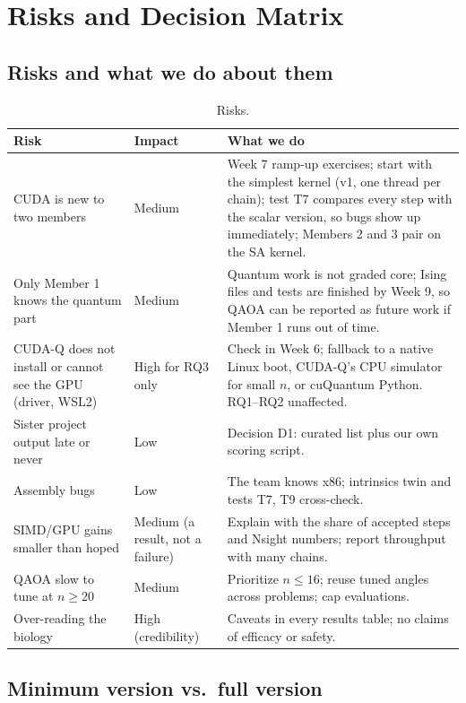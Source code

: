 \section{Risks and Decision Matrix}
\label{app:risks}

\subsection{Risks and what we do about them}

\begin{table}[ht]
\centering
\small
\begin{tabularx}{\linewidth}{>{\raggedright\arraybackslash}p{3.5cm}>{\raggedright\arraybackslash}p{1.5cm}X}
\toprule
Risk & Impact & What we do \\
\midrule
CUDA is new to two members & Medium & Week 7 ramp-up exercises; start with the simplest kernel (v1, one thread per chain); test T7 compares every step with the scalar version, so bugs show up immediately; Members 2 and 3 pair on the SA kernel. \\
Only Member 1 knows the quantum part & Medium & Quantum work is not graded core; Ising files and tests are finished by Week 9, so QAOA can be reported as future work if Member 1 runs out of time. \\
CUDA-Q does not install or cannot see the GPU (driver, WSL2) & High for RQ3 only & Check in Week 6; fallback to a native Linux boot, CUDA-Q's CPU simulator for small $n$, or cuQuantum Python. RQ1--RQ2 unaffected. \\
Sister project output late or never & Low & Decision D1: curated list plus our own scoring script. \\
Assembly bugs & Low & The team knows x86; intrinsics twin and tests T7, T9 cross-check. \\
SIMD/GPU gains smaller than hoped & Medium (a result, not a failure) & Explain with the share of accepted steps and Nsight numbers; report throughput with many chains. \\
QAOA slow to tune at $n\ge 20$ & Medium & Prioritize $n\le 16$; reuse tuned angles across problems; cap evaluations. \\
Over-reading the biology & High (credibility) & Caveats in every results table; no claims of efficacy or safety. \\
\bottomrule
\end{tabularx}
\caption{Risks.}
\end{table}

\subsection{Minimum version vs.\ full version}

